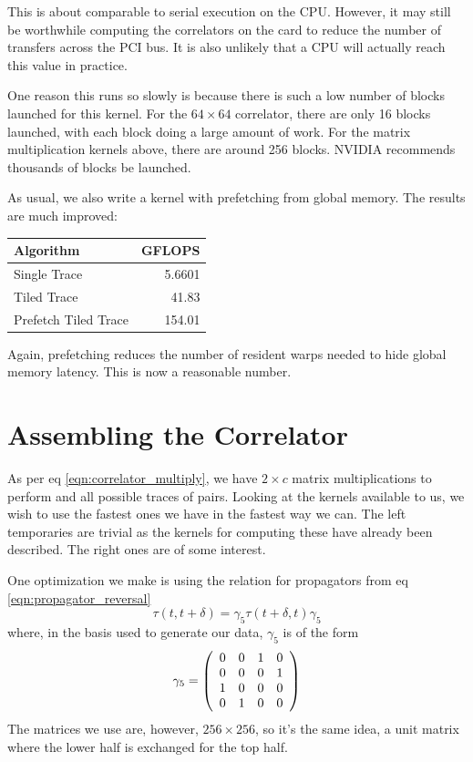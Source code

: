 \documentclass[a4paper,12pt]{report}
\newenvironment{CUDAtiming}%
{\setlength{\extrarowheight}{1.5pt} \begin{center}\begin{tabular}{l|r} Algorithm & GFLOPS\\\hline}%
{\end{tabular}\end{center}}
\begin{document}
This is about comparable to serial execution on the CPU.
However, it may still be worthwhile computing the correlators on the card to reduce the number of transfers across the PCI bus.
It is also unlikely that a CPU will actually reach this value in practice.

One reason this runs so slowly is because there is such a low number of blocks launched for this kernel.
For the $64 \times 64$ correlator, there are only 16 blocks launched, with each block doing a large amount of work.
For the matrix multiplication kernels above, there are around 256 blocks.
NVIDIA recommends thousands of blocks be launched.

As usual, we also write a kernel with prefetching from global memory. The results are much improved:

\begin{CUDAtiming}
Single Trace & 5.6601\\
Tiled Trace & 41.83\\
Prefetch Tiled Trace & 154.01
\end{CUDAtiming}

Again, prefetching reduces the number of resident warps needed to hide global memory latency.
This is now a reasonable number.



\section{Assembling the Correlator}
As per eq \ref{eqn:correlator_multiply}, we have $2\times c$ matrix multiplications to perform and all possible traces of pairs.
Looking at the kernels available to us, we wish to use the fastest ones we have in the fastest way we can.
The left temporaries are trivial as the kernels for computing these have already been described.
The right ones are of some interest.

One optimization we make is using the relation for propagators from eq \ref{eqn:propagator_reversal}
%
\begin{equation*}
\tau(t, t+\delta) = \gamma_5 \tau(t+\delta, t) \gamma_5
\end{equation*}
%
where, in the basis used to generate our data, $\gamma_5$ is of the form
%
\begin{equation}
\gamma_5 = 
\left(
	\begin{array}{c c c c c c}
	0 & 0 & 1 & 0\\
	0 & 0 & 0 & 1\\
	1 & 0 & 0 & 0\\
	0 & 1 & 0 & 0
	\end{array}
\right)
\end{equation}
%
The matrices we use are, however, $256 \times 256$, so it's the same idea, a unit matrix where the lower half is exchanged for the top half.
\end{document}
